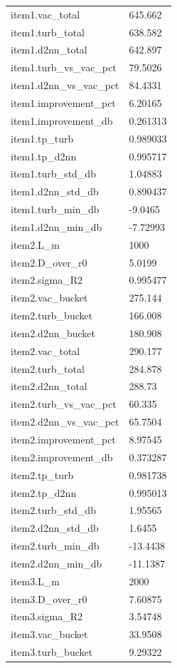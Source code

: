\begin{longtable}{p{}p{}}
item1.vac\_total & 645.662\\
item1.turb\_total & 638.582\\
item1.d2nn\_total & 642.897\\
item1.turb\_vs\_vac\_pct & 79.5026\\
item1.d2nn\_vs\_vac\_pct & 84.4331\\
item1.improvement\_pct & 6.20165\\
item1.improvement\_db & 0.261313\\
item1.tp\_turb & 0.989033\\
item1.tp\_d2nn & 0.995717\\
item1.turb\_std\_db & 1.04883\\
item1.d2nn\_std\_db & 0.890437\\
item1.turb\_min\_db & -9.0465\\
item1.d2nn\_min\_db & -7.72993\\
item2.L\_m & 1000\\
item2.D\_over\_r0 & 5.0199\\
item2.sigma\_R2 & 0.995477\\
item2.vac\_bucket & 275.144\\
item2.turb\_bucket & 166.008\\
item2.d2nn\_bucket & 180.908\\
item2.vac\_total & 290.177\\
item2.turb\_total & 284.878\\
item2.d2nn\_total & 288.73\\
item2.turb\_vs\_vac\_pct & 60.335\\
item2.d2nn\_vs\_vac\_pct & 65.7504\\
item2.improvement\_pct & 8.97545\\
item2.improvement\_db & 0.373287\\
item2.tp\_turb & 0.981738\\
item2.tp\_d2nn & 0.995013\\
item2.turb\_std\_db & 1.95565\\
item2.d2nn\_std\_db & 1.6455\\
item2.turb\_min\_db & -13.4438\\
item2.d2nn\_min\_db & -11.1387\\
item3.L\_m & 2000\\
item3.D\_over\_r0 & 7.60875\\
item3.sigma\_R2 & 3.54748\\
item3.vac\_bucket & 33.9508\\
item3.turb\_bucket & 9.29322\\

\end{longtable}
